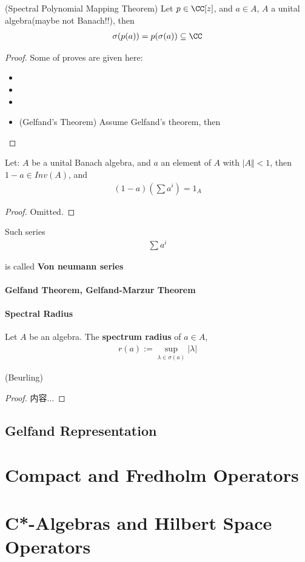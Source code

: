 \documentclass[Total.tex]{subfiles}
\begin{document}
			
			\begin{theorem}
				(Spectral Polynomial  Mapping Theorem) 
				Let $p\in \CC[z]$, and $a\in A$, $A$ a unital algebra(maybe not Banach!!), then
				\begin{gather*}
					\sigma(p(a))=p(\sigma(a))\subseteq \CC
				\end{gather*}
			\end{theorem}
			\begin{proof}
				Some of proves are given here:
				\begin{itemize}
					\item 
					\item 
					\item 
					\item (Gelfand's Theorem) Assume Gelfand's theorem, then\
				\end{itemize}
			\end{proof}
			\begin{theorem}
				Let: $A$ be a unital Banach algebra, and $a$ an element of $A$ with $\vert A\Vert<1$, then $1-a\in Inv(A)$, and
				\begin{gather*}
					(1-a)(\sum a^i)=1_A
				\end{gather*}
			\end{theorem}
			\begin{proof}
				Omitted. 
			\end{proof}
			
			\begin{Def}
				Such series
				\begin{gather*}
					\sum a^i
				\end{gather*}
				
				is called \textbf{Von neumann series}
			\end{Def}
			
			\subsubsection{Gelfand Theorem, Gelfand-Marzur Theorem}
			
			\subsubsection{Spectral Radius}
				\begin{Def}
					Let $A$ be an algebra. The \textbf{spectrum radius} of $a\in A$,
					\begin{gather*}
						r(a):=\sup_{\lambda\in \sigma(a)} |\lambda|
					\end{gather*}
				\end{Def}
				
				\begin{theorem}
					(Beurling)
				\end{theorem}
				\begin{proof}
					内容...
				\end{proof}
		\section{Gelfand Representation}
			
		\chapter{Compact and Fredholm Operators}
		
		\chapter{C*-Algebras and	Hilbert Space Operators}
\end{document}
